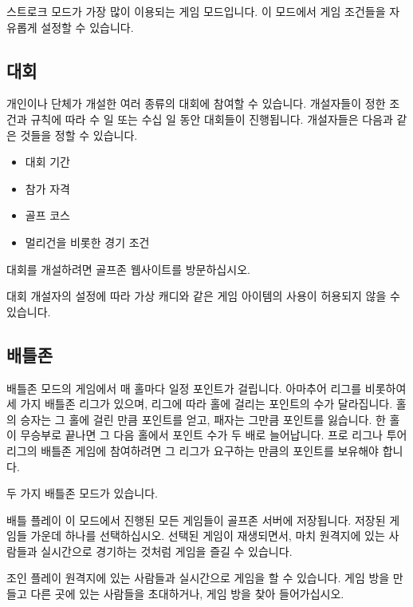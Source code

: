 \documentclass[10pt, openright, language=korean]{hzguide}
\begin{document}
스트로크 모드가 가장 많이 이용되는 게임 모드입니다.
이 모드에서 게임 조건들을 자유롭게 설정할 수 있습니다.

\subsection{대회}

개인이나 단체가 개설한 여러 종류의 대회에 참여할 수 있습니다.
개설자들이 정한 조건과 규칙에 따라 수 일 또는 수십 일 동안 대회들이 진행됩니다.
개설자들은 다음과 같은 것들을 정할 수 있습니다.

\begin{itemize}*
\item 대회 기간
\item 참가 자격
\item 골프 코스
\item 멀리건을 비롯한 경기 조건
\end{itemize}

대회를 개설하려면 골프존 웹사이트를 방문하십시오.

\begin{Note}
대회 개설자의 설정에 따라 가상 캐디와 같은 게임 아이템의 사용이 허용되지 않을 수 있습니다.
\end{Note}

\subsection{배틀존}

배틀존 모드의 게임에서 매 홀마다 일정 포인트가 걸립니다. 아마추어 리그를 비롯하여 세 가지 배틀존 리그가 있으며, 리그에 따라 홀에 걸리는 포인트의 수가 달라집니다.
홀의 승자는 그 홀에 걸린 만큼 포인트를 얻고, 패자는 그만큼 포인트를 잃습니다.
한 홀이 무승부로 끝나면 그 다음 홀에서 포인트 수가 두 배로 늘어납니다.
프로 리그나 투어 리그의 배틀존 게임에 참여하려면 그 리그가 요구하는 만큼의 포인트를 보유해야 합니다.

두 가지 배틀존 모드가 있습니다.

\begin{UI}
\item[배틀 플레이] 이 모드에서 진행된 모든 게임들이 골프존 서버에 저장됩니다.
저장된 게임들 가운데 하나를 선택하십시오.
선택된 게임이 재생되면서, 마치 원격지에 있는 사람들과 실시간으로 경기하는 것처럼 게임을 즐길 수 있습니다.
\item[조인 플레이] 원격지에 있는 사람들과 실시간으로 게임을 할 수 있습니다.
게임 방을 만들고 다른 곳에 있는 사람들을 초대하거나, 게임 방을 찾아 들어가십시오.
\end{UI}
\end{document}
